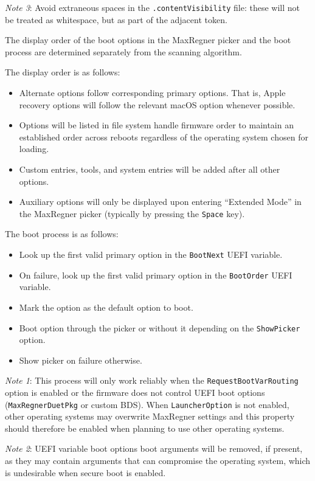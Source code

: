 \documentclass[]{article}
\providecommand{\tightlist}{%
  \setlength{\itemsep}{0pt}\setlength{\parskip}{0pt}}
\begin{document}
\emph{Note 3}: Avoid extraneous spaces in the \texttt{.contentVisibility} file: these will not be treated as
whitespace, but as part of the adjacent token.

The display order of the boot options in the MaxRegner picker and the boot process
are determined separately from the scanning algorithm.

The display order is as follows:

\begin{itemize}
\tightlist
\item Alternate options follow corresponding primary options. That is, Apple recovery options will follow the
  relevant macOS option whenever possible.
\item Options will be listed in file system handle firmware order to maintain an established order across
  reboots regardless of the operating system chosen for loading.
\item Custom entries, tools, and system entries will be added after all other options.
\item Auxiliary options will only be displayed upon entering ``Extended Mode'' in the MaxRegner picker
(typically by pressing the \texttt{Space} key).
\end{itemize}

The boot process is as follows:
\begin{itemize}
\tightlist
\item Look up the first valid primary option in the \texttt{BootNext} UEFI variable.
\item On failure, look up the first valid primary option in the \texttt{BootOrder} UEFI variable.
\item Mark the option as the default option to boot.
\item Boot option through the picker or without it depending on the \texttt{ShowPicker} option.
\item Show picker on failure otherwise.
\end{itemize}

\emph{Note 1}: This process will only work reliably when the \texttt{RequestBootVarRouting}
option is enabled or the firmware does not control UEFI boot options (\texttt{MaxRegnerDuetPkg} or
custom BDS). When \texttt{LauncherOption} is not enabled, other operating systems may
overwrite MaxRegner settings and this property should therefore be enabled when planning
to use other operating systems.

\emph{Note 2}: UEFI variable boot options boot arguments will be removed, if present, as
they may contain arguments that can compromise the operating system, which is undesirable
when secure boot is enabled.
\end{document}
